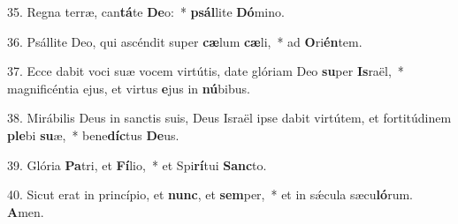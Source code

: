 35. Regna terræ, can\textbf{tá}te \textbf{De}o:~*  \textbf{psál}lite \textbf{Dó}mino.\

36. Psállite Deo, qui ascéndit super \textbf{cæ}lum \textbf{cæ}li,~*  ad \textbf{O}ri\textbf{én}tem.\

37. Ecce dabit voci suæ vocem virtútis, date glóriam Deo \textbf{su}per \textbf{Is}raël,~*  magnificéntia ejus, et virtus \textbf{e}jus in \textbf{nú}bibus.\

38. Mirábilis Deus in sanctis suis, Deus Israël ipse dabit virtútem, et fortitúdinem \textbf{ple}bi \textbf{su}æ,~*  bene\textbf{díc}tus \textbf{De}us.\

39. Glória \textbf{Pa}tri, et \textbf{Fí}lio,~*  et Spi\textbf{rí}tui \textbf{Sanc}to.\

40. Sicut erat in princípio, et \textbf{nunc}, et \textbf{sem}per,~*  et in sǽcula sæcu\textbf{ló}rum. \textbf{A}men.\

